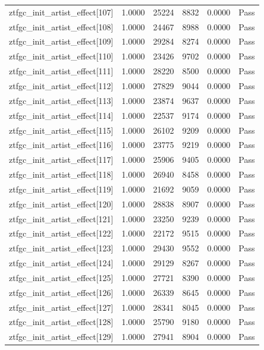 \begin{table}[htbp]
\begin{tabular}{llrrll}
ztfgc\_init\_artist\_effect[107] & 1.0000 & 25224 & 8832 & 0.0000 & Pass \\
ztfgc\_init\_artist\_effect[108] & 1.0000 & 24467 & 8988 & 0.0000 & Pass \\
ztfgc\_init\_artist\_effect[109] & 1.0000 & 29284 & 8274 & 0.0000 & Pass \\
ztfgc\_init\_artist\_effect[110] & 1.0000 & 23426 & 9702 & 0.0000 & Pass \\
ztfgc\_init\_artist\_effect[111] & 1.0000 & 28220 & 8500 & 0.0000 & Pass \\
ztfgc\_init\_artist\_effect[112] & 1.0000 & 27829 & 9044 & 0.0000 & Pass \\
ztfgc\_init\_artist\_effect[113] & 1.0000 & 23874 & 9637 & 0.0000 & Pass \\
ztfgc\_init\_artist\_effect[114] & 1.0000 & 22537 & 9174 & 0.0000 & Pass \\
ztfgc\_init\_artist\_effect[115] & 1.0000 & 26102 & 9209 & 0.0000 & Pass \\
ztfgc\_init\_artist\_effect[116] & 1.0000 & 23775 & 9219 & 0.0000 & Pass \\
ztfgc\_init\_artist\_effect[117] & 1.0000 & 25906 & 9405 & 0.0000 & Pass \\
ztfgc\_init\_artist\_effect[118] & 1.0000 & 26940 & 8458 & 0.0000 & Pass \\
ztfgc\_init\_artist\_effect[119] & 1.0000 & 21692 & 9059 & 0.0000 & Pass \\
ztfgc\_init\_artist\_effect[120] & 1.0000 & 28838 & 8907 & 0.0000 & Pass \\
ztfgc\_init\_artist\_effect[121] & 1.0000 & 23250 & 9239 & 0.0000 & Pass \\
ztfgc\_init\_artist\_effect[122] & 1.0000 & 22172 & 9515 & 0.0000 & Pass \\
ztfgc\_init\_artist\_effect[123] & 1.0000 & 29430 & 9552 & 0.0000 & Pass \\
ztfgc\_init\_artist\_effect[124] & 1.0000 & 29129 & 8267 & 0.0000 & Pass \\
ztfgc\_init\_artist\_effect[125] & 1.0000 & 27721 & 8390 & 0.0000 & Pass \\
ztfgc\_init\_artist\_effect[126] & 1.0000 & 26339 & 8645 & 0.0000 & Pass \\
ztfgc\_init\_artist\_effect[127] & 1.0000 & 28341 & 8045 & 0.0000 & Pass \\
ztfgc\_init\_artist\_effect[128] & 1.0000 & 25790 & 9180 & 0.0000 & Pass \\
ztfgc\_init\_artist\_effect[129] & 1.0000 & 27941 & 8904 & 0.0000 & Pass \\

\end{tabular}
\end{table}
